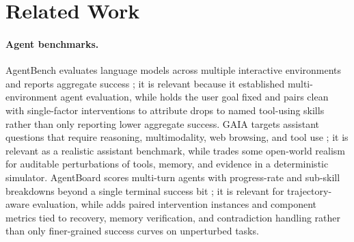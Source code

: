 \section{Related Work}

\paragraph{Agent benchmarks.}
AgentBench evaluates language models across multiple interactive environments and reports aggregate success \citep{liu2025agentbenchevaluatingllmsagents}; it is relevant because it established multi-environment agent evaluation, while \CAB{} holds the user goal fixed and pairs clean with single-factor interventions to attribute drops to named tool-using skills rather than only reporting lower aggregate success.
GAIA targets assistant questions that require reasoning, multimodality, web browsing, and tool use \citep{mialon2023gaiabenchmarkgeneralai}; it is relevant as a realistic assistant benchmark, while \CAB{} trades some open-world realism for auditable perturbations of tools, memory, and evidence in a deterministic simulator.
AgentBoard scores multi-turn agents with progress-rate and sub-skill breakdowns beyond a single terminal success bit \citep{ma2024agentboardanalyticalboardmultiturn}; it is relevant for trajectory-aware evaluation, while \CAB{} adds paired intervention instances and component metrics tied to recovery, memory verification, and contradiction handling rather than only finer-grained success curves on unperturbed tasks.

